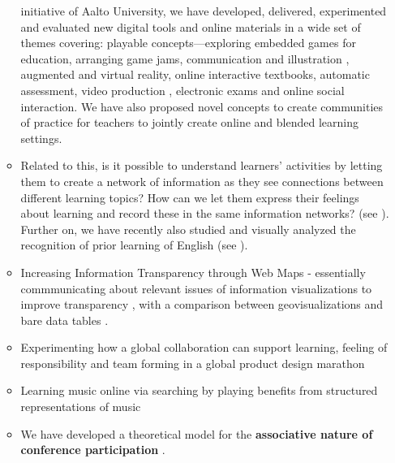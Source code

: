 \documentclass[11pt,letterpaper]{article}
\begin{document}
\begin{itemize}
\begin{itemize}
    initiative of Aalto University, we have developed, delivered, experimented and evaluated new digital tools and online materials in a wide set of themes covering:
    playable concepts---exploring embedded games for education, arranging game jams\cite{gamejams-2021}, communication and illustration \cite{playable-concepts-2020}, augmented and virtual reality, online interactive textbooks, automatic
    assessment, video production \cite{era-of-online-videos-2018}, electronic exams
     and online social interaction. We have also proposed novel concepts to
     create communities of practice for teachers to jointly create online and blended
     learning settings.
     \item Related to this, is it possible to understand learners' activities by
     letting them to create a network of information as they see connections
     between different learning topics? How can we let them express their
     feelings about learning and record these in the same information networks?
     (see \cite{visual-self-assessment-2018}). Further on, we have recently also
     studied and visually analyzed the recognition of prior learning of English
     (see \cite{rpl-test-or-assess-2019}).
    \item Increasing Information Transparency through Web Maps -
   essentially commmunicating about relevant issues of information
   visualizations to improve transparency \cite{AW4city2018}, with a comparison
   between geovisualizations and bare data tables
   \cite{geoviz-data-tables-2018}.
    \item Experimenting how a global collaboration can support learning,
    feeling of responsibility and team forming in a global product design
    marathon \cite{global-design-relay-2017}
    \item Learning music online via searching by playing benefits from
     structured representations of music \cite{MusicOWL-2017}
    \item We have developed a theoretical model for the \textbf{associative
    nature of conference participation} \cite{associative-nature-2016}.


  \end{itemize}


\end{itemize}
\end{document}
